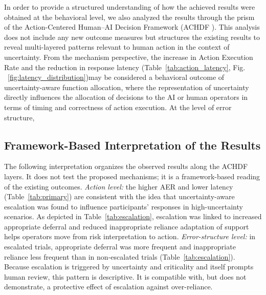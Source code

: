\documentclass[journal]{IEEEtran}
\theoremstyle{plain}
\theoremstyle{definition}
\providecommand{\DIFaddtex}[1]{{\protect\color{blue} \sf #1}} %
\providecommand{\DIFdeltex}[1]{{\protect\color{red} \scriptsize #1}} %
\providecommand{\DIFaddbegin}{} %
\providecommand{\DIFaddend}{} %
\providecommand{\DIFdelbegin}{} %
\providecommand{\DIFdelend}{} %
\providecommand{\DIFadd}[1]{\texorpdfstring{\DIFaddtex{#1}}{#1}} %
\providecommand{\DIFdel}[1]{\texorpdfstring{\DIFdeltex{#1}}{}} %
\newcommand{\DIFscaledelfig}{0.5}
\newlength{\DIFdelgraphicswidth} %
\newlength{\DIFdelgraphicsheight} %
\newcommand{\DIFaddincludegraphics}[2][]{{\color{blue}\fbox{\DIFOincludegraphics[#1]{#2}}}} %
\newcommand{\DIFdelincludegraphics}[2][]{%
\sbox{\DIFdelgraphicsbox}{\DIFOincludegraphics[#1]{#2}}%
\settoboxwidth{\DIFdelgraphicswidth}{\DIFdelgraphicsbox} %
\settoboxtotalheight{\DIFdelgraphicsheight}{\DIFdelgraphicsbox} %
\scalebox{\DIFscaledelfig}{%
\parbox[b]{\DIFdelgraphicswidth}{\usebox{\DIFdelgraphicsbox}\\[-\baselineskip] \rule{\DIFdelgraphicswidth}{0em}}\llap{\resizebox{\DIFdelgraphicswidth}{\DIFdelgraphicsheight}{%
\setlength{\unitlength}{\DIFdelgraphicswidth}%
\begin{picture}(1,1)%
\thicklines\linethickness{2pt} %
{\color[rgb]{1,0,0}\put(0,0){\framebox(1,1){}}}%
{\color[rgb]{1,0,0}\put(0,0){\line( 1,1){1}}}%
{\color[rgb]{1,0,0}\put(0,1){\line(1,-1){1}}}%
\end{picture}%
}\hspace*{3pt}}} %
} %
\DeclareRobustCommand{\DIFaddbegin}{\DIFOaddbegin \let\includegraphics\DIFaddincludegraphics} %
\DeclareRobustCommand{\DIFaddend}{\DIFOaddend \let\includegraphics\DIFOincludegraphics} %
\DeclareRobustCommand{\DIFdelbegin}{\DIFOdelbegin \let\includegraphics\DIFdelincludegraphics} %
\DeclareRobustCommand{\DIFdelend}{\DIFOaddend \let\includegraphics\DIFOincludegraphics} %
\begin{document}
\DIFdel{In order to provide a structured understanding of how the achieved results were obtained at the behavioral level, we also analyzed the results through the prism of the Action-Centered Human--AI Decision Framework (ACHDF ). This analysis does not include any new outcome measures but structures the existing results to reveal multi-layered patterns relevant to human action in the context of uncertainty.
From the mechanism perspective, the increase in Action Execution Rate and the reduction in response latency (Table~\ref{tab:action_latency}, Fig. ~\ref{fig:latency_distribution})may be considered a behavioral outcome of uncertainty-aware function allocation, where the representation of uncertainty directly influences the allocation of decisions to the AI or human operators in terms of timing and correctness of action execution. At the level of error structure, }\DIFdelend \DIFaddbegin \subsection{\DIFadd{Framework-Based Interpretation of the Results}}
\label{sec:interpretation}
\DIFadd{The following interpretation organizes the observed results along the ACHDF layers. It does not test the proposed mechanisms; it is a framework-based reading of the existing outcomes.
\emph{Action level:} the higher AER and lower latency (Table~\ref{tab:primary}) are consistent with the idea that }\DIFaddend uncertainty-aware \DIFdelbegin \DIFdel{escalation was found to influence participants’ responses in high-uncertainty scenarios.
As depicted in Table~\ref{tab:escalation}, escalation was linked to increased appropriate deferral and reduced inappropriate reliance }\DIFdelend \DIFaddbegin \DIFadd{adaptation of support helps operators move from risk interpretation to action.
\emph{Error-structure level:} in escalated trials, appropriate deferral was more frequent and inappropriate reliance less frequent than in non-escalated trials (Table~\ref{tab:escalation}). Because escalation is triggered by uncertainty and criticality and itself prompts human review, this pattern is descriptive. It is compatible with, but does not demonstrate, a protective effect of escalation against over-reliance}\DIFaddend .
\end{document}
